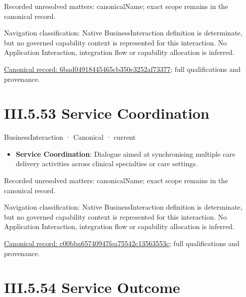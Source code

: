 {\small Recorded unresolved matters: canonicalName; exact scope remains in the canonical record.}\par
{\small Navigation classification: Native BusinessInteraction definition is determinate, but no governed capability context is represented for this interaction. No Application Interaction, integration flow or capability allocation is inferred.}\par
{\footnotesize \href{../../../../../../../continuum/business/business-interaction/6bad04918445465cb350c3252af73377.md}{Canonical record: 6bad04918445465cb350c3252af73377}; full qualifications and provenance.}\par
\section*{III.5.53 Service Coordination}
\label{navigation:III.5.53}

\label{element:c00bba65740947fea75542c13563553c}
{\small BusinessInteraction · Canonical · current}\par

\begin{itemize}


\item \textbf{Service Coordination}: Dialogue aimed at synchronising multiple care delivery activities across clinical specialties or care settings.

\end{itemize}

{\small Recorded unresolved matters: canonicalName; exact scope remains in the canonical record.}\par
{\small Navigation classification: Native BusinessInteraction definition is determinate, but no governed capability context is represented for this interaction. No Application Interaction, integration flow or capability allocation is inferred.}\par
{\footnotesize \href{../../../../../../../continuum/business/business-interaction/c00bba65740947fea75542c13563553c.md}{Canonical record: c00bba65740947fea75542c13563553c}; full qualifications and provenance.}\par
\section*{III.5.54 Service Outcome}
\label{navigation:III.5.54}

